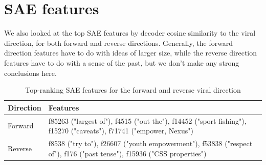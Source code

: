 \documentclass{article}
\newcommand{\fix}[1]{{\color{red}#1}}\raggedbottom %
\begin{document}
\section{SAE features}
\label{app:saefeats}
We also looked at the top SAE features by decoder cosine similarity to the viral direction, for both forward and reverse directions. Generally, the forward direction features have to do with ideas of larger size, while the reverse direction features have to do with a sense of the past, but we don't make any strong conclusions here. 
\begin{table}[h]
\centering
\caption{Top-ranking SAE features for the forward and reverse viral direction}
\label{tab:sae-seed-eff}
\begin{tabular}{lp{8cm}}
\toprule
 Direction& Features \\
\midrule
 Forward& f85263 ("largest of"), f4515 ("out the"), f14452 ("sport fishing"), f15270 ("caveats"), f71741 ("empower, Nexus")\\
  Reverse& f8538 ("try to"), f26607 ("youth empowerment"), f53838 ("respect of"), f176 ("past tense"), f15936 ("CSS properties")\\
\end{tabular}
\end{table}




\end{document}
